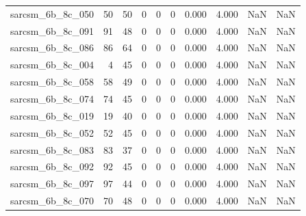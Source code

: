 \documentclass{article}
\begin{document}
\begin{longtable}{lrrrrrrrrr}
sarcsm\_6b\_8c\_050 & 50 & 50 & 0 & 0 & 0 & 0.000 & 4.000 & NaN & NaN \\
sarcsm\_6b\_8c\_091 & 91 & 48 & 0 & 0 & 0 & 0.000 & 4.000 & NaN & NaN \\
sarcsm\_6b\_8c\_086 & 86 & 64 & 0 & 0 & 0 & 0.000 & 4.000 & NaN & NaN \\
sarcsm\_6b\_8c\_004 & 4 & 45 & 0 & 0 & 0 & 0.000 & 4.000 & NaN & NaN \\
sarcsm\_6b\_8c\_058 & 58 & 49 & 0 & 0 & 0 & 0.000 & 4.000 & NaN & NaN \\
sarcsm\_6b\_8c\_074 & 74 & 45 & 0 & 0 & 0 & 0.000 & 4.000 & NaN & NaN \\
sarcsm\_6b\_8c\_019 & 19 & 40 & 0 & 0 & 0 & 0.000 & 4.000 & NaN & NaN \\
sarcsm\_6b\_8c\_052 & 52 & 45 & 0 & 0 & 0 & 0.000 & 4.000 & NaN & NaN \\
sarcsm\_6b\_8c\_083 & 83 & 37 & 0 & 0 & 0 & 0.000 & 4.000 & NaN & NaN \\
sarcsm\_6b\_8c\_092 & 92 & 45 & 0 & 0 & 0 & 0.000 & 4.000 & NaN & NaN \\
sarcsm\_6b\_8c\_097 & 97 & 44 & 0 & 0 & 0 & 0.000 & 4.000 & NaN & NaN \\
sarcsm\_6b\_8c\_070 & 70 & 48 & 0 & 0 & 0 & 0.000 & 4.000 & NaN & NaN \\
\end{longtable}
\end{document}
